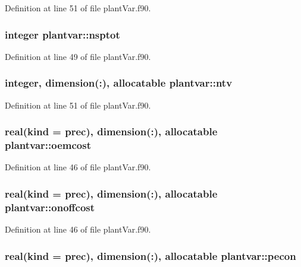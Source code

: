 Definition at line 51 of file plant\-Var.\-f90.

\hypertarget{classplantvar_a1301bcb36aec6c118be8c084932de099}{
\subsubsection[{nsptot}]{\setlength{\rightskip}{0pt plus 5cm}integer plantvar\-::nsptot}}\label{classplantvar_a1301bcb36aec6c118be8c084932de099}


Definition at line 49 of file plant\-Var.\-f90.

\hypertarget{classplantvar_a019098844671b06b71ae0b76aa3d4fa8}{
\subsubsection[{ntv}]{\setlength{\rightskip}{0pt plus 5cm}integer, dimension(\-:), allocatable plantvar\-::ntv}}\label{classplantvar_a019098844671b06b71ae0b76aa3d4fa8}


Definition at line 51 of file plant\-Var.\-f90.

\hypertarget{classplantvar_a70a5a58ce085d08a2b8fb1434ab5862c}{
\subsubsection[{oemcost}]{\setlength{\rightskip}{0pt plus 5cm}real(kind = prec), dimension(\-:), allocatable plantvar\-::oemcost}}\label{classplantvar_a70a5a58ce085d08a2b8fb1434ab5862c}


Definition at line 46 of file plant\-Var.\-f90.

\hypertarget{classplantvar_a2e95a86439f2372f77360c8ba1efaaff}{
\subsubsection[{onoffcost}]{\setlength{\rightskip}{0pt plus 5cm}real(kind = prec), dimension(\-:), allocatable plantvar\-::onoffcost}}\label{classplantvar_a2e95a86439f2372f77360c8ba1efaaff}


Definition at line 46 of file plant\-Var.\-f90.

\hypertarget{classplantvar_a5f4279bfe683122d1505b7df5897ac45}{
\subsubsection[{pecon}]{\setlength{\rightskip}{0pt plus 5cm}real(kind = prec), dimension(\-:), allocatable plantvar\-::pecon}}\label{classplantvar_a5f4279bfe683122d1505b7df5897ac45}


